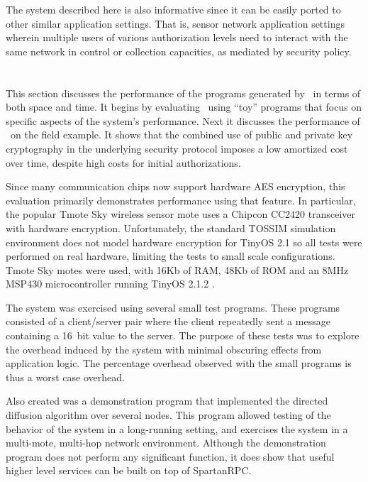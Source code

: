 The system described here is also informative since it can be easily ported to other similar
application settings. That is, sensor network application settings wherein multiple users of
various authorization levels need to interact with the same network in control or collection
capacities, as mediated by security policy.

\section{\Sprocket}
\label{section-sprocket-evaluation}

This section discusses the performance of the programs generated by \Sprocket\ in terms of
both space and time. It begins by evaluating \Sprocket\ using ``toy'' programs that focus on
specific aspects of the system's performance. Next it discusses the performance of \Sprocket\ on
the field example. It shows that the combined use of public and private key cryptography in the
underlying security protocol imposes a low amortized cost over time, despite high costs for
initial authorizations.

Since many communication chips now support hardware AES encryption, this evaluation primarily
demonstrates performance using that feature. In particular, the popular Tmote Sky wireless
sensor mote \cite{tmotesky-datasheet} uses a Chipcon CC2420 transceiver with hardware
encryption. Unfortunately, the standard TOSSIM simulation environment does not model hardware
encryption for TinyOS 2.1 so all tests were performed on real hardware, limiting the tests to
small scale configurations. Tmote Sky motes were used, with 16Kb of RAM, 48Kb of ROM and an 8MHz
MSP430 microcontroller running TinyOS 2.1.2 \cite{tinyos}.

The system was exercised using several small test programs. These programs consisted of a
client/server pair where the client repeatedly sent a message containing a 16~bit value to the
server. The purpose of these tests was to explore the overhead induced by the system with
minimal obscuring effects from application logic. The percentage overhead observed with the
small programs is thus a worst case overhead.

Also created was a demonstration program that implemented the directed diffusion algorithm
\cite{intanagonwiwat-2003} over several nodes. This program allowed testing of the behavior of
the system in a long-running setting, and exercises the system in a multi-mote, multi-hop
network environment. Although the demonstration program does not perform any significant
function, it does show that useful higher level services can be built on top of SpartanRPC.

